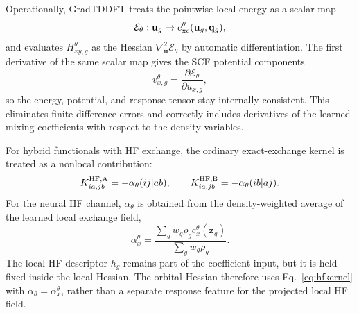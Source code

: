 Operationally, GradTDDFT treats the pointwise local energy as a
scalar map
\begin{equation}
  \mathcal{E}_\theta:\mathbf{u}_g\mapsto
  e_{\rm xc}^{\theta}(\mathbf{u}_g,\mathbf{q}_g),
  \label{eq:pointwise-map}
\end{equation}
and evaluates $H_{xy,g}^{\theta}$ as the Hessian
$\nabla_{\mathbf{u}}^2\mathcal{E}_\theta$ by automatic
differentiation. The first derivative of the same scalar map gives
the SCF potential components
\begin{equation}
  v_{x,g}^{\theta}
  =
  \frac{\partial \mathcal{E}_\theta}
       {\partial u_{x,g}},
  \label{eq:potential-components}
\end{equation}
so the energy, potential, and response tensor stay internally
consistent. This eliminates finite-difference errors and correctly
includes derivatives of the learned mixing coefficients with
respect to the density variables.

For hybrid functionals with HF exchange, the ordinary exact-exchange
kernel is treated as a nonlocal contribution:
\begin{equation}
  K_{ia,jb}^{\rm HF,A} = -\alpha_\theta(ij|ab), \qquad
  K_{ia,jb}^{\rm HF,B} = -\alpha_\theta(ib|aj).
  \label{eq:hfkernel}
\end{equation}
For the neural HF channel, $\alpha_\theta$ is obtained from the
density-weighted average of the learned local exchange field,
\begin{equation}
  \alpha_x^\theta
  =
  \frac{\sum_g w_g \rho_g c_x^\theta(\mathbf{z}_g)}
       {\sum_g w_g \rho_g}.
  \label{eq:hf-scalar-response-si}
\end{equation}
The local HF descriptor $h_g$ remains part of the coefficient input,
but it is held fixed inside the local Hessian. The orbital Hessian
therefore uses Eq.~\eqref{eq:hfkernel} with
$\alpha_\theta=\alpha_x^\theta$, rather than a separate response
feature for the projected local HF field.

